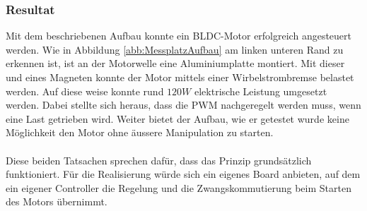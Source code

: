 \subsubsection{Resultat}
\label{chap:VersuchsResultat}
\fi
Mit dem beschriebenen Aufbau konnte ein BLDC-Motor erfolgreich angesteuert 
werden. Wie in Abbildung \ref{abb:MessplatzAufbau} am linken unteren Rand zu 
erkennen ist, ist an der Motorwelle eine Aluminiumplatte montiert. Mit dieser 
und eines Magneten konnte der Motor mittels einer Wirbelstrombremse belastet 
werden. Auf diese weise konnte rund $120 W$ elektrische Leistung umgesetzt 
werden. Dabei stellte sich heraus, dass die PWM nachgeregelt werden muss, wenn 
eine Last getrieben wird. Weiter bietet der Aufbau, wie er getestet wurde 
keine Möglichkeit den Motor ohne äussere Manipulation zu starten.\\
\\
Diese beiden Tatsachen sprechen dafür, dass das Prinzip grundsätzlich 
funktioniert. Für die Realisierung würde sich ein eigenes Board anbieten, auf 
dem ein eigener Controller die Regelung und die Zwangskommutierung beim 
Starten des Motors übernimmt.
